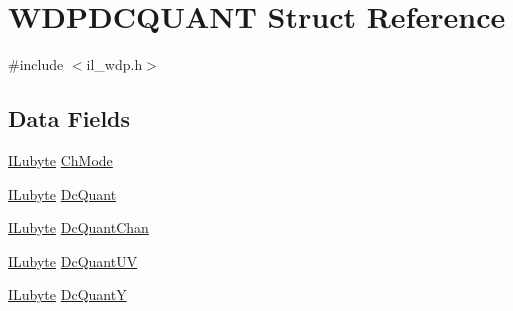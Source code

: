 \hypertarget{struct_w_d_p_d_c_q_u_a_n_t}{\section{W\-D\-P\-D\-C\-Q\-U\-A\-N\-T Struct Reference}
\label{struct_w_d_p_d_c_q_u_a_n_t}
}


{\ttfamily \#include $<$il\-\_\-wdp.\-h$>$}

\subsection*{Data Fields}
\begin{DoxyCompactItemize}
\item 
\hyperlink{il_8h_a8d2f04500100a86d1b00e98ab1b15a33}{I\-Lubyte} \hyperlink{struct_w_d_p_d_c_q_u_a_n_t_a50bf9a72224995705039b34880c92570}{Ch\-Mode}
\item 
\hyperlink{il_8h_a8d2f04500100a86d1b00e98ab1b15a33}{I\-Lubyte} \hyperlink{struct_w_d_p_d_c_q_u_a_n_t_a2a29e5b8722edd71c08f139c6baaaf46}{Dc\-Quant}
\item 
\hyperlink{il_8h_a8d2f04500100a86d1b00e98ab1b15a33}{I\-Lubyte} \hyperlink{struct_w_d_p_d_c_q_u_a_n_t_a4057d18c80e52b627b6eb00c64677ffe}{Dc\-Quant\-Chan}
\item 
\hyperlink{il_8h_a8d2f04500100a86d1b00e98ab1b15a33}{I\-Lubyte} \hyperlink{struct_w_d_p_d_c_q_u_a_n_t_ab0a55f898fcae0cecc94f9e2932e2ce8}{Dc\-Quant\-U\-V}
\item 
\hyperlink{il_8h_a8d2f04500100a86d1b00e98ab1b15a33}{I\-Lubyte} \hyperlink{struct_w_d_p_d_c_q_u_a_n_t_a3e5645c73e3d370e605c3cad68a853d6}{Dc\-Quant\-Y}
\end{DoxyCompactItemize}


